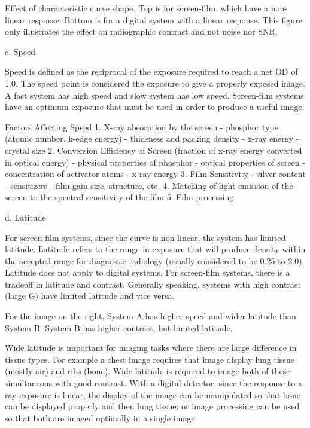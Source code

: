 \documentclass[mphy386-notes.tex]{subfiles}
\begin{document}
Effect of characteristic curve shape.  Top is for screen-film, which have a
non-linear response. Bottom is for a digital system with a linear response.
This figure only illustrates the effect on radiographic contrast and not noise
nor SNR.

c. Speed 

Speed is defined as the reciprocal of the exposure required to reach a net OD of
1.0. The speed point is considered the exposure to give a properly exposed
image. A fast system has high speed and slow system has low speed.  Screen-film
systems have an optimum exposure that must be used in order to produce a useful
image.

Factors Affecting Speed
1.  X-ray absorption by the screen
- phosphor type (atomic number, k-edge energy)
- thickness and packing density
- x-ray energy
- crystal size
2.  Conversion Efficiency of Screen (fraction of x-ray energy converted in optical energy)
- physical properties of phosphor
- optical properties of screen
- concentration of activator atoms
- x-ray energy
3.  Film Sensitivity
- silver content
- sensitizers
- film gain size, structure, etc.
4.  Matching of light emission of the screen to the spectral sensitivity of the film
5.  Film processing

d.	Latitude

For screen-film systems, since the curve is non-linear, the system has limited
latitude. Latitude refers to the range in exposure that will produce density
within the accepted range for diagnostic radiology (usually considered to be
0.25 to 2.0). Latitude does not apply to digital systems. For screen-film
systems, there is a tradeoff in latitude and contrast. Generally speaking,
systems with high contrast (large G) have limited latitude and vice versa.

For the image on the right, System A has higher speed and wider latitude than
System B. System B has higher contrast, but limited latitude.

Wide latitude is important for imaging tasks where there are large difference in
tissue types. For example a chest image requires that image display lung tissue
(mostly air) and ribs (bone). Wide latitude is required to image both of these
simultaneous with good contrast. With a digital detector, since the response to
x-ray exposure is linear, the display of the image can be manipulated so that
bone can be displayed properly and then lung tissue; or image processing can be
used so that both are imaged optimally in a single image.
\end{document}
